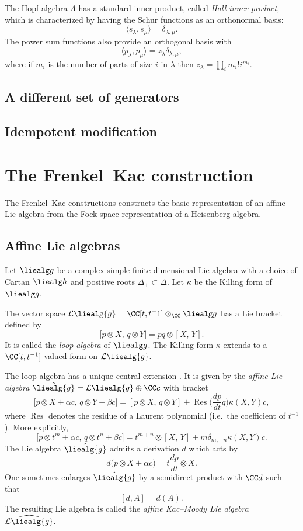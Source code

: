 \documentclass{ck-article}
\newcommand\loopliealg[1]{\mathcal{L}\liealg{#1}}
\newcommand\affliealg[1]{\hat{\liealg{#1}}}
\newcommand\affKMliealg[1]{\widehat{\loopliealg{#1}}}
\DeclareMathOperator\Res{Res}
\begin{document}
The Hopf algebra $\Lambda$ has a standard inner product, called \emph{Hall inner product}, which is characterized by having the Schur functions as an orthonormal basis:
\[
    \langle s_\lambda, s_\mu\rangle = \delta_{\lambda,\mu}.
\]
The power sum functions also provide an orthogonal basis with
\[
    \langle p_\lambda, p_\mu\rangle = z_\lambda\delta_{\lambda,\mu},
\]
where if $m_i$ is the number of parts of size $i$ in $\lambda$ then $z_\lambda = \prod_i m_i!i^{m_i}$.

\subsection{A different set of generators}

\subsection{Idempotent modification}

\section{The Frenkel--Kac construction}

The Frenkel--Kac constructions constructs the basic representation of an affine Lie algebra from the Fock space representation of a Heisenberg algebra.

\subsection{Affine Lie algebras}

Let $\liealg g$ be a complex simple finite dimensional Lie algebra with a choice of Cartan $\liealg h$ and positive roots $\Delta_+ \subset \Delta$.
Let $\kappa$ be the Killing form of $\liealg g$.

The vector space $\loopliealg g = \CC[t, t^-1] \otimes_\CC \liealg g$ has a Lie bracket defined by 
\[
    \bigl[ p \otimes X,\, q \otimes Y\bigr] = pq \otimes [X,\,Y].
\]
It is called the \emph{loop algebra} of $\liealg g$.
The Killing form $\kappa$ extends to a $\CC[t,t^{-1}]$-valued form on $\loopliealg g$.

The loop algebra has a unique central extension \cite[Theorem~10.2]{Gordon:2009:InfiniteDimensionalLieAlgebras}.
It is given by the \emph{affine Lie algebra} $\affliealg g = \loopliealg g \oplus \CC c$ with bracket
\[
    \bigl[p \otimes X + \alpha c,\, q \otimes Y + \beta c\bigr]  =
    [p\otimes X,\, q \otimes Y] + \Res\biggl(\frac{dp}{dt}q\biggr)\kappa(X,Y)c,
\]
where $\Res$ denotes the residue of a Laurent polynomial (i.e.~the coefficient of $t^{-1}$).
More explicitly,
\[
    \bigl[p \otimes t^m + \alpha c,\, q \otimes t^n + \beta c\bigr]  =
    t^{m+n} \otimes [X,\, Y] + m\delta_{m,-n}\kappa(X,Y)c.
\]
The Lie algebra $\affliealg g$ admits a derivation $d$ which acts by
\[
    d\bigl(p \otimes X + \alpha c) = t\frac{dp}{dt} \otimes X.
\]
One sometimes enlarges $\affliealg g$ by a semidirect product with $\CC d$ such that
\[
    [d, A] = d(A).
\]
The resulting Lie algebra is called the \emph{affine Kac--Moody Lie algebra} $\affKMliealg g$.
\end{document}
